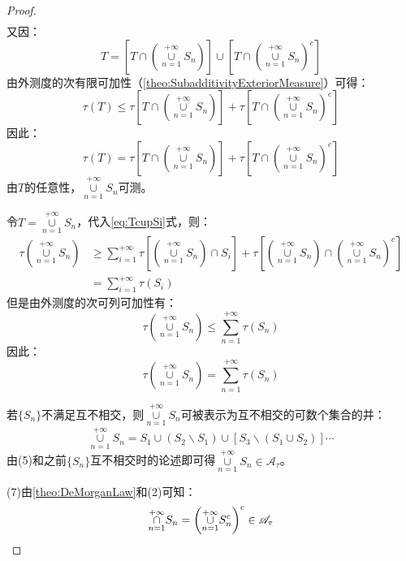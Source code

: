\begin{proof}
\begin{align}
	\end{align}
	又因：
	\begin{equation*}
		T=\left[T\cap\left(\underset{n=1}{\overset{+\infty}{\cup}}S_n\right)\right]\cup\left[T\cap\left(\underset{n=1}{\overset{+\infty}{\cup}}S_n\right)^c\right]
	\end{equation*}
	由外测度的次有限可加性（\cref{theo:SubadditivityExteriorMeasure}）可得：
	\begin{equation*}
		\tau(T)\leqslant \tau\left[T\cap\left(\underset{n=1}{\overset{+\infty}{\cup}}S_n\right)\right]+\tau\left[T\cap\left(\underset{n=1}{\overset{+\infty}{\cup}}S_n\right)^c\right]
	\end{equation*}
	因此：
	\begin{equation*}
		\tau(T)= \tau\left[T\cap\left(\underset{n=1}{\overset{+\infty}{\cup}}S_n\right)\right]+\tau\left[T\cap\left(\underset{n=1}{\overset{+\infty}{\cup}}S_n\right)^c\right]
	\end{equation*}
	由$T$的任意性，$\underset{n=1}{\overset{+\infty}{\cup}}S_n$可测。\par
	令$T=\underset{n=1}{\overset{+\infty}{\cup}}S_n$，代入\cref{eq:TcupSi}式，则：
	\begin{align*}
		\tau\left(\underset{n=1}{\overset{+\infty}{\cup}}S_n\right)
		&\geqslant\sum_{i=1}^{+\infty} \tau\left[\left(\underset{n=1}{\overset{+\infty}{\cup}}S_n\right)\cap S_i\right]+\tau\left[\left(\underset{n=1}{\overset{+\infty}{\cup}}S_n\right)\cap\left(\underset{n=1}{\overset{+\infty}{\cup}}S_n\right)^c\right] \\
		&=\sum_{i=1}^{+\infty} \tau(S_i)
	\end{align*}
	但是由外测度的次可列可加性有：
	\begin{equation*}
		\tau\left(\underset{n=1}{\overset{+\infty}{\cup}}S_n\right)\leqslant\sum_{n=1}^{+\infty} \tau(S_n)
	\end{equation*}
	因此：
	\begin{equation*}
		\tau\left(\underset{n=1}{\overset{+\infty}{\cup}}S_n\right)=\sum_{n=1}^{+\infty} \tau(S_n)
	\end{equation*}\par
	若$\{S_n\}$不满足互不相交，则$\underset{n=1}{\overset{+\infty}{\cup}}S_n$可被表示为互不相交的可数个集合的并：
	\begin{equation*}
		\underset{n=1}{\overset{+\infty}{\cup}}S_n=S_1\cup (S_2\backslash S_1)\cup[S_3\backslash(S_1\cup S_2)]\cdots
	\end{equation*}
	由(5)和之前$\{S_n\}$互不相交时的论述即可得$\underset{n=1}{\overset{+\infty}{\cup}}S_n\in \mathscr{A}_{\tau}$。\par
	(7)由\cref{theo:DeMorganLaw}和(2)可知：
	\begin{equation*}
		\underset{n=1}{\overset{+\infty}{\cap}}S_n=\left(\underset{n=1}{\overset{+\infty}{\cup}}S_n^c\right)^c\in \mathscr{A}_{\tau}\qedhere
	\end{equation*}
\end{proof}
